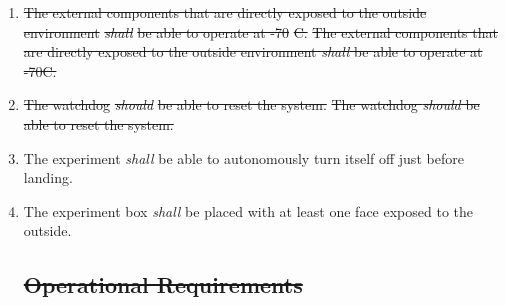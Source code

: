 \documentclass[a4paper,12pt,twoside]{article}
\providecommand{\DIFdeltex}[1]{{\protect\color{red}\sout{#1}}}                      %
\providecommand{\DIFaddbegin}{} %
\providecommand{\DIFaddend}{} %
\providecommand{\DIFdelbegin}{} %
\providecommand{\DIFdelend}{} %
\providecommand{\DIFdel}[1]{\texorpdfstring{\DIFdeltex{#1}}{}} %
\newcommand{\DIFscaledelfig}{0.5}
\newlength{\DIFdelgraphicswidth} %
\newlength{\DIFdelgraphicsheight} %
\newcommand{\DIFaddincludegraphics}[2][]{{\color{blue}\fbox{\DIFOincludegraphics[#1]{#2}}}} %
\newcommand{\DIFdelincludegraphics}[2][]{%
\sbox{\DIFdelgraphicsbox}{\DIFOincludegraphics[#1]{#2}}%
\settoboxwidth{\DIFdelgraphicswidth}{\DIFdelgraphicsbox} %
\settoboxtotalheight{\DIFdelgraphicsheight}{\DIFdelgraphicsbox} %
\scalebox{\DIFscaledelfig}{%
\parbox[b]{\DIFdelgraphicswidth}{\usebox{\DIFdelgraphicsbox}\\[-\baselineskip] \rule{\DIFdelgraphicswidth}{0em}}\llap{\resizebox{\DIFdelgraphicswidth}{\DIFdelgraphicsheight}{%
\setlength{\unitlength}{\DIFdelgraphicswidth}%
\begin{picture}(1,1)%
\thicklines\linethickness{2pt} %
{\color[rgb]{1,0,0}\put(0,0){\framebox(1,1){}}}%
{\color[rgb]{1,0,0}\put(0,0){\line( 1,1){1}}}%
{\color[rgb]{1,0,0}\put(0,1){\line(1,-1){1}}}%
\end{picture}%
}\hspace*{3pt}}} %
} %
\DeclareRobustCommand{\DIFaddbegin}{\DIFOaddbegin \let\includegraphics\DIFaddincludegraphics} %
\DeclareRobustCommand{\DIFaddend}{\DIFOaddend \let\includegraphics\DIFOincludegraphics} %
\DeclareRobustCommand{\DIFdelbegin}{\DIFOdelbegin \let\includegraphics\DIFdelincludegraphics} %
\DeclareRobustCommand{\DIFdelend}{\DIFOaddend \let\includegraphics\DIFOincludegraphics} %
\begin{document}
\begin{enumerate}[label=D.\arabic*]
\DIFdel{be able to survive and operate between -30}%
\DIFdel{C and 60}%
\DIFdel{C.
    }\DIFdelend \DIFaddbegin \st{The experiment \textit{shall} be able to survive and operate between -30\degree C and 60\degree C.}
    \DIFaddend \item \DIFdelbegin \DIFdel{The external components that are directly exposed to the outside environment }\textit{\DIFdel{shall}} %
\DIFdel{be able to operate at -70}%
\DIFdel{C.
    }\DIFdelend \DIFaddbegin \st{The external components that are directly exposed to the outside environment \textit{shall} be able to operate at -70\degree C.}
    \DIFaddend \item \DIFdelbegin \DIFdel{The watchdog }\textit{\DIFdel{should}} %
\DIFdel{be able to reset the system.
    }\DIFdelend \DIFaddbegin \st{The watchdog \textit{should} be able to reset the system.}
    \DIFaddend \item The experiment \textit{shall} be able to autonomously turn itself off just before landing.
    \item The experiment box \textit{shall} be placed with at least one face exposed to the outside.
    \DIFdelbegin %
\subsection{\DIFdel{Operational Requirements}}
\addtocounter{subsection}{-1}%


\end{enumerate}
\end{document}
